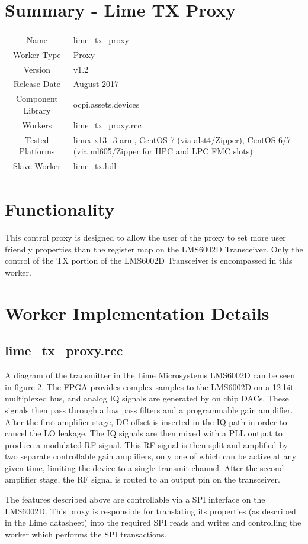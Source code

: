 \documentclass{article}
\author{} %
\date{Version \docVersion} %
\title{\docTitle}
\def\docVersion{1.2}
\def\comp{lime\_tx\_proxy}
\def\Comp{Lime TX Proxy}
\begin{document}
\section*{Summary - \Comp}
\begin{tabular}{|c|M{13.5cm}|}
	\hline
	                  &                \\
	\hline
	Name              & \comp          \\
	\hline
	Worker Type       & Proxy          \\
	\hline
	Version           & v\docVersion \\
	\hline
	Release Date      & August 2017 \\
	\hline
	Component Library & ocpi.assets.devices   \\
	\hline
	Workers           & \comp.rcc      \\
	\hline
	Tested Platforms  & linux-x13\_3-arm, CentOS 7 (via alst4/Zipper), CentOS 6/7 (via ml605/Zipper for HPC and LPC FMC slots) \\
	\hline
	Slave Worker      & lime\_tx.hdl   \\
	\hline
\end{tabular}

\section*{Functionality}
This control proxy is designed to allow the user of the proxy to set more user friendly properties than the register map on the LMS6002D Transceiver.  Only the control of the TX portion of the LMS6002D Transceiver is encompassed in this worker.

\section*{Worker Implementation Details}
\subsection*{\comp.rcc}
A diagram of the transmitter in the Lime Microsystems LMS6002D can be seen in figure 2. The FPGA provides complex samples to the LMS6002D on a 12 bit multiplexed bus, and analog IQ signals are generated by on chip DACs. These signals then pass through a low pass filters and a programmable gain amplifier. After the first amplifier stage, DC offset is inserted in the IQ path in order to cancel the LO leakage. The IQ signals are then mixed with a PLL output to produce a modulated RF signal. This RF signal is then split and amplified by two separate controllable gain amplifiers, only one of which can be active at any given time, limiting the device to a single transmit channel. After the second amplifier stage, the RF signal is routed to an output pin on the transceiver.\par\bigskip
\noindent The features described above are controllable via a SPI interface on the LMS6002D. This proxy is responsible for translating its properties (as described in the Lime datasheet) into the required SPI reads and writes and controlling the worker which performs the SPI transactions.
\newpage
\end{document}
